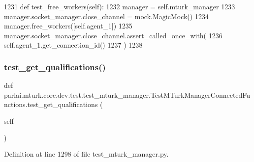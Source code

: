 \begin{DoxyCode}
1231     \textcolor{keyword}{def }test\_free\_workers(self):
1232         manager = self.mturk\_manager
1233         manager.socket\_manager.close\_channel = mock.MagicMock()
1234         manager.free\_workers([self.agent\_1])
1235         manager.socket\_manager.close\_channel.assert\_called\_once\_with(
1236             self.agent\_1.get\_connection\_id()
1237         )
1238 
\end{DoxyCode}
\mbox{\label{classparlai_1_1mturk_1_1core_1_1dev_1_1test_1_1test__mturk__manager_1_1TestMTurkManagerConnectedFunctions_afe09472ef978a90bd79e8cd36f96c713}} 
\subsubsection{\texorpdfstring{test\+\_\+get\+\_\+qualifications()}{test\_get\_qualifications()}}
{\footnotesize\ttfamily def parlai.\+mturk.\+core.\+dev.\+test.\+test\+\_\+mturk\+\_\+manager.\+Test\+M\+Turk\+Manager\+Connected\+Functions.\+test\+\_\+get\+\_\+qualifications (\begin{DoxyParamCaption}\item[{}]{self }\end{DoxyParamCaption})}



Definition at line 1298 of file test\+\_\+mturk\+\_\+manager.\+py.


